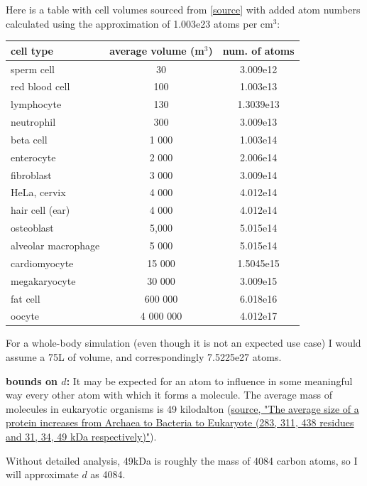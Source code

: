 \documentclass[a4paper]{article}
\begin{document}
	Here is a table with cell volumes sourced from [\href{https://book.bionumbers.org/how-big-is-a-human-cell/}{source}] with added atom numbers calculated using the approximation of 1.003e23 atoms per cm$^3$:
	
	\begin{center}
		\begin{tabular}{|l|c|c|}
			\hline
			\textbf{cell type} & \textbf{average volume (\textmu m$^3$)} & \textbf{num. of atoms} \\
			\hline
			sperm cell & 30 & 3.009e12 \\
			red blood cell & 100 & 1.003e13 \\
			lymphocyte & 130 & 1.3039e13 \\
			neutrophil & 300 & 3.009e13 \\
			beta cell & 1 000 & 1.003e14 \\
			enterocyte & 2 000 & 2.006e14 \\
			fibroblast & 3 000 & 3.009e14 \\
			HeLa, cervix & 4 000 & 4.012e14 \\
			hair cell (ear) & 4 000 & 4.012e14 \\
			osteoblast & 5,000 & 5.015e14 \\
			alveolar macrophage & 5 000 & 5.015e14 \\
			cardiomyocyte & 15 000 & 1.5045e15 \\
			megakaryocyte & 30 000 & 3.009e15 \\
			fat cell & 600 000 & 6.018e16 \\
			oocyte & 4 000 000 & 4.012e17 \\
			\hline
		\end{tabular}
	\end{center}
	
	For a whole-body simulation (even though it is not an expected use case) I would assume a 75L of volume, and correspondingly 7.5225e27 atoms.
	
	\pagebreak
	
	\textbf{bounds on $d$:} It may be expected for an atom to influence in some meaningful way every other atom with which it forms a molecule. The average mass of molecules in eukaryotic organisms is 49 kilodalton (\href{https://en.wikipedia.org/wiki/Protein#Biosynthesis}{source, "The average size of a protein increases from Archaea to Bacteria to Eukaryote (283, 311, 438 residues and 31, 34, 49 kDa respectively)"}).
	
	\medskip
	
	Without detailed analysis, 49kDa is roughly the mass of 4084 carbon atoms, so I will approximate $d$ as 4084.
	
\end{document}
